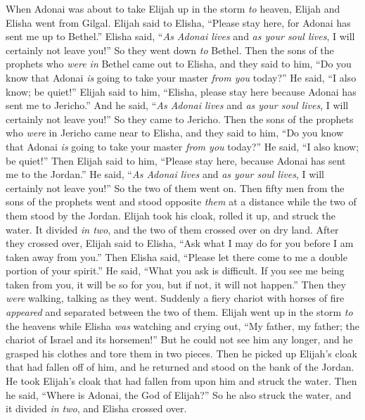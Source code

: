 \begin{biblechapter} %
 When Adonai was about to take Elijah up in the storm \textit{to} heaven, Elijah and Elisha went from Gilgal.
\verse Elijah said to Elisha, “Please stay here, for Adonai has sent me up to Bethel.” Elisha said, “\textit{As Adonai lives} and \textit{as your soul lives}, I will certainly not leave you!” So they went down \textit{to} Bethel.
\verse Then the sons of the prophets who \textit{were in} Bethel came out to Elisha, and they said to him, “Do you know that Adonai \textit{is} going to take your master \textit{from you} today?” He said, “I also know; be quiet!”
\verse Elijah said to him, “Elisha, please stay here because Adonai has sent me to Jericho.” And he said, “\textit{As Adonai lives} and \textit{as your soul lives}, I will certainly not leave you!” So they came to Jericho.
\verse Then the sons of the prophets who \textit{were} in Jericho came near to Elisha, and they said to him, “Do you know that Adonai \textit{is} going to take your master \textit{from you} today?” He said, “I also know; be quiet!”
\verse Then Elijah said to him, “Please stay here, because Adonai has sent me to the Jordan.” He said, “\textit{As Adonai lives} and \textit{as your soul lives}, I will certainly not leave you!” So the two of them went on.
\verse Then fifty men from the sons of the prophets went and stood opposite \textit{them} at a distance while the two of them stood by the Jordan.
\verse Elijah took his cloak, rolled it up, and struck the water. It divided \textit{in two}, and the two of them crossed over on dry land.
\verse After they crossed over, Elijah said to Elisha, “Ask what I may do for you before I am taken away from you.” Then Elisha said, “Please let there come to me a double portion of your spirit.”
\verse He said, “What you ask is difficult. If you see me being taken from you, it will be so for you, but if not, it will not happen.”
\verse Then they \textit{were} walking, talking as they went. Suddenly a fiery chariot with horses of fire \textit{appeared} and separated between the two of them. Elijah went up in the storm \textit{to} the heavens
\verse while Elisha \textit{was} watching and crying out, “My father, my father; the chariot of Israel and its horsemen!” But he could not see him any longer, and he grasped his clothes and tore them in two pieces.
\verse Then he picked up Elijah’s cloak that had fallen off of him, and he returned and stood on the bank of the Jordan.
\verse He took Elijah’s cloak that had fallen from upon him and struck the water. Then he said, “Where is Adonai, the God of Elijah?” So he also struck the water, and it divided \textit{in two}, and Elisha crossed over.

\end{biblechapter}
